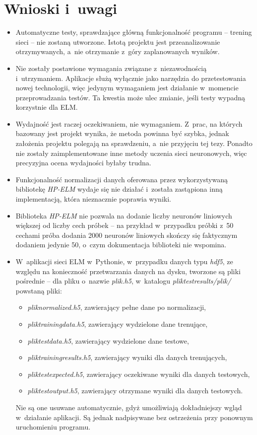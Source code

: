 \documentclass[pl]{minipw} %
\begin{document}
\section{Wnioski i~uwagi}
\begin{itemize}
\item Automatyczne testy, sprawdzające główną funkcjonalność programu -- trening sieci -- nie zostaną utworzone. Istotą projektu jest przeanalizowanie otrzymywanych, a~nie otrzymanie z~góry zaplanowanych wyników.
\item Nie zostały postawione wymagania związane z~niezawodnością i~utrzymaniem. Aplikacje służą wyłącznie jako narzędzia do przetestowania nowej technologii, więc jedynym wymaganiem jest działanie w~momencie przeprowadzania testów. Ta kwestia może ulec zmianie, jeśli testy wypadną korzystnie dla ELM.
\item Wydajność jest raczej oczekiwaniem, nie wymaganiem. Z~prac, na których bazowany jest projekt wynika, że metoda powinna być szybka, jednak założenia projektu polegają na sprawdzeniu, a~nie przyjęciu tej tezy. Ponadto nie zostały zaimplementowane inne metody uczenia sieci neuronowych, więc precyzyjna ocena wydajności byłaby trudna.
\item Funkcjonalność normalizacji danych oferowana przez wykorzystywaną bibliotekę \textit{HP-ELM} wydaje się nie działać i~została zastąpiona inną implementacją, która nieznacznie poprawia wyniki.
\item Biblioteka \textit{HP-ELM} nie pozwala na dodanie liczby neuronów liniowych większej od liczby cech próbek -- na przykład w~przypadku próbki z~50 cechami próba dodania 2000 neuronów liniowych skończy się faktycznym dodaniem jedynie 50, o~czym dokumentacja biblioteki nie wspomina.
\item W~aplikacji sieci ELM w~Pythonie, w~przypadku danych typu \textit{hdf5}, ze względu na konieczność przetwarzania danych na dysku, tworzone są pliki pośrednie -- dla pliku o~nazwie \textit{plik.h5}, w~katalogu \textit{plik\textunderscore test\textunderscore results/plik/} powstaną pliki:
\begin{itemize}
\item \textit{plik\textunderscore normalized.h5}, zawierający pełne dane po normalizacji, 
\item \textit{plik\textunderscore training\textunderscore data.h5}, zawierający wydzielone dane trenujące, 
\item \textit{plik\textunderscore test\textunderscore data.h5}, zawierający wydzielone dane testowe,
\item \textit{plik\textunderscore training\textunderscore results.h5}, zawierający wyniki dla danych trenujących,
\item \textit{plik\textunderscore test\textunderscore expected.h5}, zawierający oczekiwane wyniki dla danych testowych,
\item \textit{plik\textunderscore test\textunderscore output.h5}, zawierający otrzymane wyniki dla danych testowych.
\end{itemize} 
Nie są one usuwane automatycznie, gdyż umożliwiają dokładniejszy wgląd w~działanie aplikacji. Są jednak nadpisywane bez ostrzeżenia przy ponownym uruchomieniu programu.
\end{itemize}
\clearpage
\end{document}
